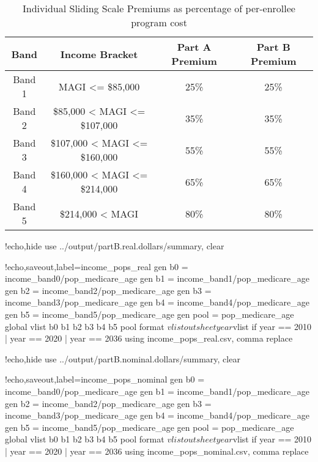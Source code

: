 \documentclass{article}
\begin{document}
\begin{table}[ht]
\caption{Individual Sliding Scale Premiums as percentage of per-enrollee program cost}
\label{tab:sliding}
\centering
\begin{tabular}{|c|c|c|c|}\hline
\textbf{Band} & \textbf{Income Bracket} & \textbf{Part A Premium} & \textbf{Part B Premium}\\\hline
Band 1 & MAGI <= \$85,000 & 25\% & 25\%\\\hline
Band 2 & \$85,000 < MAGI <= \$107,000 & 35\% & 35\%\\\hline
Band 3 & \$107,000 < MAGI <= \$160,000  & 55\% & 55\%\\\hline
Band 4 & \$160,000 < MAGI <= \$214,000 & 65\% & 65\%\\\hline
Band 5 & \$214,000 < MAGI & 80\% & 80\%\\\hline
\end{tabular}
\end{table}

\begin{Statacode}{!echo,hide}
use ../output/partB.real.dollars/summary, clear
\end{Statacode}
\begin{Statacode}{!echo,saveout,label=income_pops_real}
gen b0 = income_band0/pop_medicare_age
gen b1 = income_band1/pop_medicare_age
gen b2 = income_band2/pop_medicare_age
gen b3 = income_band3/pop_medicare_age
gen b4 = income_band4/pop_medicare_age
gen b5 = income_band5/pop_medicare_age
gen pool = pop_medicare_age
global vlist b0 b1 b2 b3 b4 b5 pool
format $vlist %
outsheet year $vlist if year == 2010 | year == 2020 | year == 2036 using income_pops_real.csv, comma replace
\end{Statacode}
\begin{Statacode}{!echo,hide}
use ../output/partB.nominal.dollars/summary, clear
\end{Statacode}
\begin{Statacode}{!echo,saveout,label=income_pops_nominal}
gen b0 = income_band0/pop_medicare_age
gen b1 = income_band1/pop_medicare_age
gen b2 = income_band2/pop_medicare_age
gen b3 = income_band3/pop_medicare_age
gen b4 = income_band4/pop_medicare_age
gen b5 = income_band5/pop_medicare_age
gen pool = pop_medicare_age
global vlist b0 b1 b2 b3 b4 b5 pool
format $vlist %
outsheet year $vlist if year == 2010 | year == 2020 | year == 2036 using income_pops_nominal.csv, comma replace
\end{Statacode}

\end{document}
